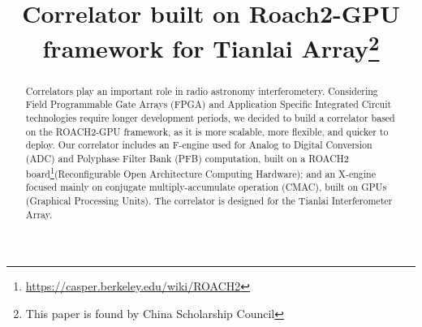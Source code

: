 \documentclass{ws-jai}
\begin{document}


\title{Correlator built on Roach2-GPU framework for Tianlai Array\footnote{This paper is found by  China Scholarship Council }}  

\author{
}

\address{
\small
$^1$Central China Normal University ,Luoyu Road, Wuhan, China\\
$^2$National Astronomy Observatory , Chinese Academy of Sciences \\Datun(A) Road, No.30,Beijing, China\\
$^3$University of California Berkeley, Campbell Hall 339, Berkeley CA 94720\\
$^4$China Three Gorges University,Yichang China 443002
}

\maketitle
{}


\begin{abstract}
Correlators play an important role in radio astronomy interferometery. Considering Field Programmable Gate Arrays (FPGA) and Application Specific Integrated Circuit technologies require longer development periods, we decided to build a correlator based on the ROACH2-GPU framework, as it is more scalable, more flexible, and quicker to deploy. Our correlator includes an F-engine used for Analog to Digital Conversion (ADC) and Polyphase Filter Bank (PFB) computation, built on a ROACH2 board\footnote{ \url{https://casper.berkeley.edu/wiki/ROACH2}}(Reconfigurable Open Architecture Computing Hardware); and an X-engine focused mainly on conjugate multiply-accumulate operation (CMAC), built on GPUs (Graphical Processing Units). The correlator is designed for the Tianlai Interferometer Array.

\end{abstract}
%
\end{document}
